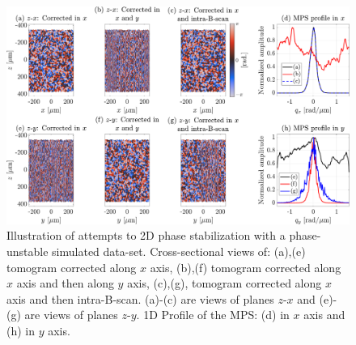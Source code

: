 \begin{figure}[htb!]
	\centering
	\includegraphics[width=\textwidth]{Figures/SHARP/PhaseStabilization/PhaseStabiliaztion2D.pdf}
	\caption[Illustration of attempts to 2D phase stabilization with a phase-unstable simulated data-set.]{Illustration of attempts to 2D phase stabilization with a phase-unstable simulated data-set. Cross-sectional views of: (a),(e) tomogram corrected along $x$ axis, (b),(f) tomogram corrected along $x$ axis and then along $y$ axis, (c),(g), tomogram corrected along $x$ axis and then intra-B-scan. (a)-(c) are views of planes $z$-$x$ and (e)-(g) are views of planes $z$-$y$. 1D Profile of the MPS: (d) in $x$ axis and (h) in $y$ axis.}
	\label{fig:PhaseStable2D}
\end{figure}

